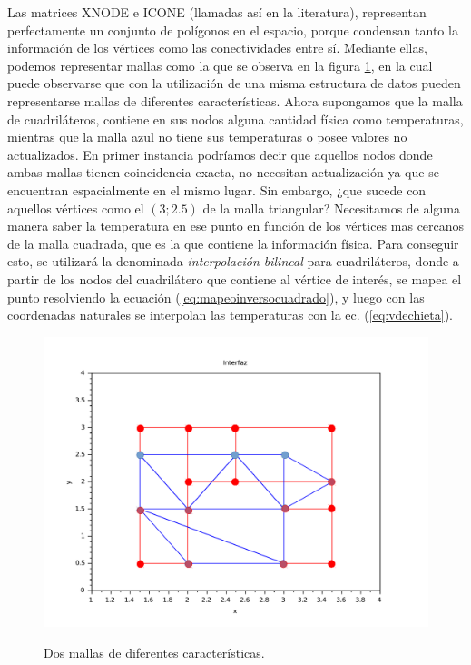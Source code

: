 Las matrices XNODE e ICONE (llamadas así en la literatura), representan perfectamente un conjunto de polígonos en el espacio, porque condensan tanto la información de los vértices como las conectividades entre sí. Mediante ellas, podemos representar mallas como la que se observa en la figura \ref{fig:malla1}, en la cual puede observarse que con la utilización de una misma estructura de datos pueden representarse mallas de diferentes características. Ahora supongamos que la malla de cuadriláteros, contiene en sus nodos alguna cantidad física como temperaturas, mientras que la malla azul no tiene sus temperaturas o posee valores no actualizados. En primer instancia podríamos decir que aquellos nodos donde ambas mallas tienen coincidencia exacta, no necesitan actualización ya que se encuentran espacialmente en el mismo lugar. Sin embargo, ¿que sucede con aquellos vértices como el $(3;2.5)$ de la malla triangular? Necesitamos de alguna manera saber la temperatura en ese punto en función de los vértices mas cercanos de la malla cuadrada, que es la que contiene la información física. Para conseguir esto, se utilizará la denominada \emph{interpolación bilineal} para cuadriláteros, donde a partir de los nodos del cuadrilátero que contiene al vértice de interés, se mapea el punto resolviendo la ecuación (\ref{eq:mapeoinversocuadrado}), y luego con las coordenadas naturales se interpolan las temperaturas con la ec. (\ref{eq:vdechieta}).


\begin{figure}
\centering
\includegraphics[scale=.55]{mallascuad1tri3p.pdf}
\caption{\label{fig:malla1} } Dos mallas de diferentes características.
\end{figure}

